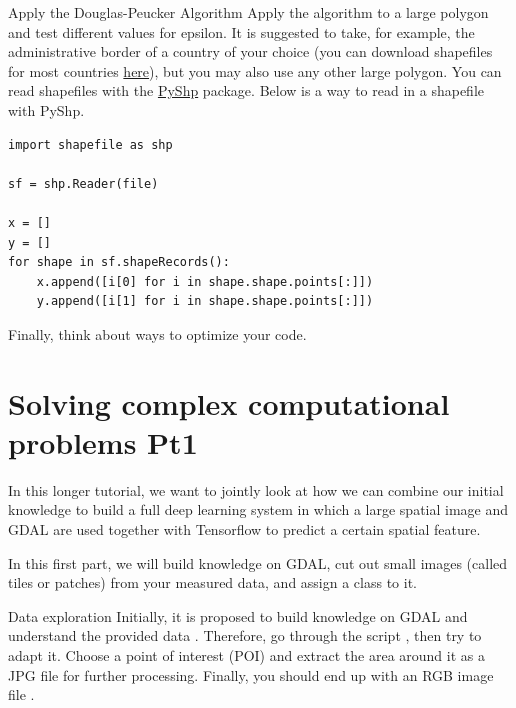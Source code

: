 \documentclass[twoside]{article}
\begin{document}
\begin{task}{Apply the Douglas-Peucker Algorithm}{}{}
Apply the algorithm to a large polygon and test different values for epsilon. 
It is suggested to take, for example, the administrative border of a country of your choice (you can download shapefiles for most countries \href{https://www.diva-gis.org/gdata}{here}), but you may also use any other large polygon.
You can read shapefiles with the \href{https://pypi.org/project/pyshp/}{PyShp} package.
Below is a way to read in a shapefile with PyShp.

\begin{lstlisting}
import shapefile as shp 

sf = shp.Reader(file)

x = []
y = []
for shape in sf.shapeRecords():
    x.append([i[0] for i in shape.shape.points[:]])
    y.append([i[1] for i in shape.shape.points[:]])
\end{lstlisting}

Finally, think about ways to optimize your code.

\end{task}


\clearpage
\section{Solving complex computational problems Pt1}

In this longer tutorial, we want to jointly look at how we can combine our initial knowledge to build a full deep learning system in which a large spatial image and GDAL are used together with Tensorflow to predict a certain spatial feature.

\vspace{10pt}

In this first part, we will build knowledge on GDAL, cut out small images (called tiles or patches) from your measured data, and assign a class to it.



\begin{task}{Data exploration}{}{}
Initially, it is proposed to build knowledge on GDAL and understand the provided data .
Therefore, go through the script , then try to adapt it.
Choose a point of interest (POI) and extract the area around it as a JPG file for further processing.
Finally, you should end up with an RGB image file .

\end{task}
\end{document}
